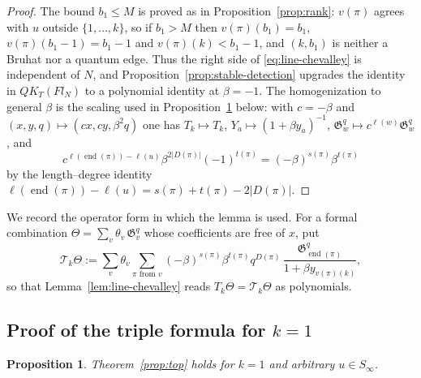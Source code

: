 \documentclass[11pt]{article}
\newtheorem{proposition}{Proposition}
\newcommand{\G}{\mathfrak{G}}
\begin{document}
\begin{proof}
The bound $b_1\leq M$ is proved as in Proposition~\ref{prop:rank}:
$v(\pi)$ agrees with $u$ outside $\{1,\ldots,k\}$, so if $b_1>M$ then
$v(\pi)(b_1)=b_1$, $v(\pi)(b_1-1)=b_1-1$ and $v(\pi)(k)<b_1-1$, and
$(k,b_1)$ is neither a Bruhat nor a quantum edge. Thus the right side
of \eqref{eq:line-chevalley} is independent of $N$, and
Proposition~\ref{prop:stable-detection} upgrades the identity in
$QK_T(Fl_N)$ to a polynomial identity at $\beta=-1$. The
homogenization to general $\beta$ is the scaling used in
Proposition~\ref{prop:k-one} below: with $c=-\beta$ and
$(x,y,q)\mapsto(cx,cy,\beta^2q)$ one has $T_k\mapsto T_k$,
$Y_a\mapsto(1+\beta y_a)^{-1}$, $\G^q_w\mapsto c^{\ell(w)}\G^q_w$,
and
\[
 c^{\ell(\operatorname{end}(\pi))-\ell(u)}\beta^{2|D(\pi)|}(-1)^{t(\pi)}
 =(-\beta)^{s(\pi)}\beta^{t(\pi)}
\]
by the length--degree identity
$\ell(\operatorname{end}(\pi))-\ell(u)=s(\pi)+t(\pi)-2|D(\pi)|$.
\end{proof}

We record the operator form in which the lemma is used. For a formal
combination $\Theta=\sum_v\theta_v\,\G_v^q$ whose coefficients are
free of $x$, put
\begin{equation}\label{eq:line-operator}
 \mathcal T_k\Theta
 :=\sum_v\theta_v\sum_{\pi\text{ from }v}
    (-\beta)^{s(\pi)}\beta^{t(\pi)}q^{D(\pi)}\,
    \frac{\G^q_{\operatorname{end}(\pi)}}{1+\beta y_{v(\pi)(k)}},
\end{equation}
so that Lemma~\ref{lem:line-chevalley} reads
$T_k\Theta=\mathcal T_k\Theta$ as polynomials.

\subsection{Proof of the triple formula for \texorpdfstring{$k=1$}{k=1}}

\begin{proposition}\label{prop:k-one}
Theorem~\ref{prop:top} holds for $k=1$ and arbitrary
$u\in S_\infty$.
\end{proposition}
\end{document}
